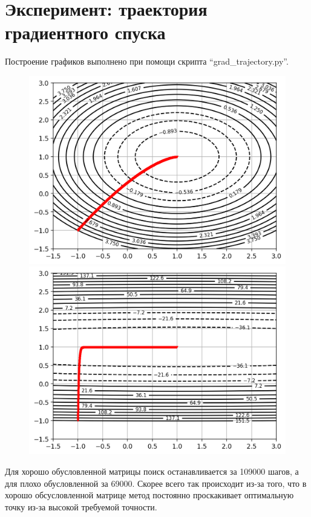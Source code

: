\documentclass[notitlepage]{article}
\begin{document}
\section{Эксперимент: траектория градиентного спуска}
Построение графиков выполнено при помощи скрипта ``grad\_trajectory.py''. 
\begin{figure}[ht]
\begin{minipage}[t]{.5\textwidth}
  \centering
  \includegraphics[width=\textwidth, keepaspectratio]{plots/trajectory_0_0.png}
\end{minipage}
\begin{minipage}[t]{.5\textwidth}
  \centering
  \includegraphics[width=\textwidth, keepaspectratio]{plots/trajectory_1_0.png}
\end{minipage}
\end{figure}
Для хорошо обусловленной матрицы поиск останавливается за 109000 шагов, а для плохо обусловленной за 69000.
Скорее всего так происходит из-за того, что в хорошо обсусловленной матрице метод постоянно проскакивает оптимальную точку
из-за высокой требуемой точности.
\end{document}
